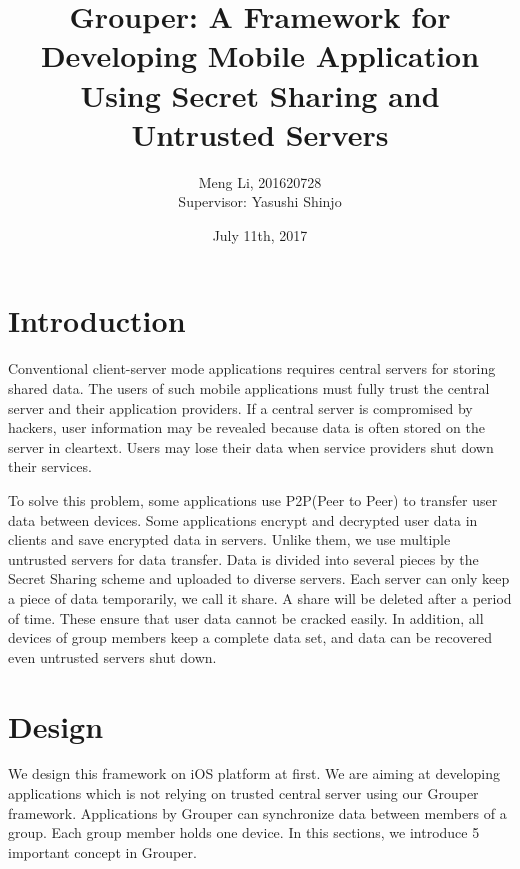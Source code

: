 \documentclass[twocolumn,10pt]{article}
\begin{document}
\small
\date{July 11th, 2017}

\title{\bf Grouper: A Framework for Developing Mobile Application Using Secret Sharing and Untrusted Servers}

\author{
	Meng Li, 201620728  
	\\ Supervisor: Yasushi Shinjo
}

\maketitle

\section{Introduction}
Conventional client-server mode applications requires central servers for storing shared data. The users of such mobile applications must fully trust the central server and their application providers. If a central server is compromised by hackers, user information may be revealed because data is often stored on the server in cleartext. Users may lose their data when service providers shut down their services. 

To solve this problem, some applications use P2P(Peer to Peer) to transfer user data between devices. Some applications encrypt and decrypted user data in clients and save encrypted data in servers. Unlike them, we use multiple untrusted servers for data transfer. Data is divided into several pieces by the Secret Sharing scheme and uploaded to diverse servers. Each server can only keep a piece of data temporarily, we call it share. A share will be deleted after a period of time. These ensure that user data cannot be cracked easily. In addition, all devices of group members keep a complete data set, and data can be recovered even untrusted servers shut down.

\section{Design}
We design this framework on iOS platform at first. We are aiming at developing applications which is not relying on trusted central server using our Grouper framework. Applications by Grouper can synchronize data between members of a group. Each group member holds one device. In this sections, we introduce 5 important concept in Grouper.
\end{document}
